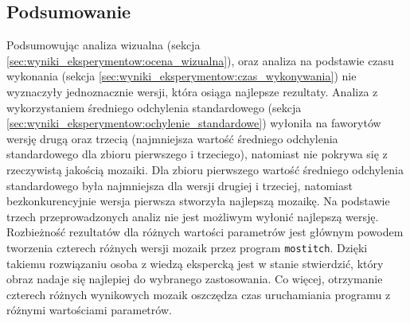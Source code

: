 \subsection{Podsumowanie}
\label{sec:wyniki_eksperymentow:podsumowanie}

Podsumowując analiza wizualna (sekcja \ref{sec:wyniki_eksperymentow:ocena_wizualna}), oraz analiza na podstawie czasu wykonania (sekcja \ref{sec:wyniki_eksperymentow:czas_wykonywania}) nie wyznaczyły jednoznacznie wersji, która osiąga najlepsze rezultaty. Analiza z wykorzystaniem średniego odchylenia standardowego (sekcja \ref{sec:wyniki_eksperymentow:ochylenie_standardowe}) wyłoniła na faworytów wersję drugą oraz trzecią (najmniejsza wartość średniego odchylenia standardowego dla zbioru pierwszego i trzeciego), natomiast nie pokrywa się z rzeczywistą jakością mozaiki. Dla zbioru pierwszego wartość średniego odchylenia standardowego była najmniejsza dla wersji drugiej i trzeciej, natomiast bezkonkurencyjnie wersja pierwsza stworzyła najlepszą mozaikę. Na podstawie trzech przeprowadzonych analiz nie jest możliwym wyłonić najlepszą wersję. Rozbieżność rezultatów dla różnych wartości parametrów jest głównym powodem tworzenia czterech różnych wersji mozaik przez program \texttt{mostitch}. Dzięki takiemu rozwiązaniu osoba z wiedzą ekspercką jest w stanie stwierdzić, który obraz nadaje się najlepiej do wybranego zastosowania. Co więcej, otrzymanie czterech różnych wynikowych mozaik oszczędza czas uruchamiania programu z różnymi wartościami parametrów.













